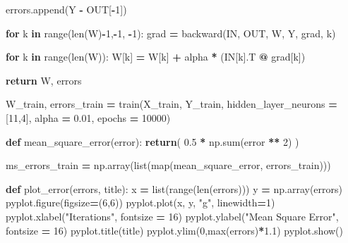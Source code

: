 \documentclass[
]{book}
\newenvironment{Shaded}{\begin{snugshade}}{\end{snugshade}}
\newcommand{\BuiltInTok}[1]{#1}
\newcommand{\ControlFlowTok}[1]{\textcolor[rgb]{0.13,0.29,0.53}{\textbf{#1}}}
\newcommand{\DecValTok}[1]{\textcolor[rgb]{0.00,0.00,0.81}{#1}}
\newcommand{\FloatTok}[1]{\textcolor[rgb]{0.00,0.00,0.81}{#1}}
\newcommand{\KeywordTok}[1]{\textcolor[rgb]{0.13,0.29,0.53}{\textbf{#1}}}
\newcommand{\NormalTok}[1]{#1}
\newcommand{\OperatorTok}[1]{\textcolor[rgb]{0.81,0.36,0.00}{\textbf{#1}}}
\newcommand{\StringTok}[1]{\textcolor[rgb]{0.31,0.60,0.02}{#1}}
\begin{document}
\begin{Shaded}
\begin{Highlighting}[]
\NormalTok{    errors.append(Y }\OperatorTok{{-}}\NormalTok{ OUT[}\OperatorTok{{-}}\DecValTok{1}\NormalTok{])}
      
    \ControlFlowTok{for}\NormalTok{ k }\KeywordTok{in} \BuiltInTok{range}\NormalTok{(}\BuiltInTok{len}\NormalTok{(W)}\OperatorTok{{-}}\DecValTok{1}\NormalTok{,}\OperatorTok{{-}}\DecValTok{1}\NormalTok{, }\OperatorTok{{-}}\DecValTok{1}\NormalTok{):}
\NormalTok{      grad }\OperatorTok{=}\NormalTok{ backward(IN, OUT, W, Y, grad, k) }
      
    \ControlFlowTok{for}\NormalTok{ k }\KeywordTok{in} \BuiltInTok{range}\NormalTok{(}\BuiltInTok{len}\NormalTok{(W)):}
\NormalTok{      W[k] }\OperatorTok{=}\NormalTok{ W[k] }\OperatorTok{+}\NormalTok{ alpha }\OperatorTok{*}\NormalTok{ (IN[k].T }\OperatorTok{@}\NormalTok{ grad[k])}
      
  \ControlFlowTok{return}\NormalTok{ W, errors}



\NormalTok{W\_train, errors\_train }\OperatorTok{=}\NormalTok{ train(X\_train, Y\_train, hidden\_layer\_neurons }\OperatorTok{=}\NormalTok{ [}\DecValTok{11}\NormalTok{,}\DecValTok{4}\NormalTok{], alpha }\OperatorTok{=} \FloatTok{0.01}\NormalTok{, epochs }\OperatorTok{=} \DecValTok{10000}\NormalTok{)}


\KeywordTok{def}\NormalTok{ mean\_square\_error(error):}
  \ControlFlowTok{return}\NormalTok{( }\FloatTok{0.5} \OperatorTok{*}\NormalTok{ np.}\BuiltInTok{sum}\NormalTok{(error }\OperatorTok{**} \DecValTok{2}\NormalTok{) )}

\NormalTok{ms\_errors\_train }\OperatorTok{=}\NormalTok{ np.array(}\BuiltInTok{list}\NormalTok{(}\BuiltInTok{map}\NormalTok{(mean\_square\_error, errors\_train)))}

\KeywordTok{def}\NormalTok{ plot\_error(errors, title):}
\NormalTok{  x }\OperatorTok{=} \BuiltInTok{list}\NormalTok{(}\BuiltInTok{range}\NormalTok{(}\BuiltInTok{len}\NormalTok{(errors)))}
\NormalTok{  y }\OperatorTok{=}\NormalTok{ np.array(errors)}
\NormalTok{  pyplot.figure(figsize}\OperatorTok{=}\NormalTok{(}\DecValTok{6}\NormalTok{,}\DecValTok{6}\NormalTok{))}
\NormalTok{  pyplot.plot(x, y, }\StringTok{"g"}\NormalTok{, linewidth}\OperatorTok{=}\DecValTok{1}\NormalTok{)}
\NormalTok{  pyplot.xlabel(}\StringTok{"Iterations"}\NormalTok{, fontsize }\OperatorTok{=} \DecValTok{16}\NormalTok{)}
\NormalTok{  pyplot.ylabel(}\StringTok{"Mean Square Error"}\NormalTok{, fontsize }\OperatorTok{=} \DecValTok{16}\NormalTok{)}
\NormalTok{  pyplot.title(title)}
\NormalTok{  pyplot.ylim(}\DecValTok{0}\NormalTok{,}\BuiltInTok{max}\NormalTok{(errors)}\OperatorTok{*}\FloatTok{1.1}\NormalTok{)}
\NormalTok{  pyplot.show()}
  

\end{Highlighting}
\end{Shaded}
\end{document}
